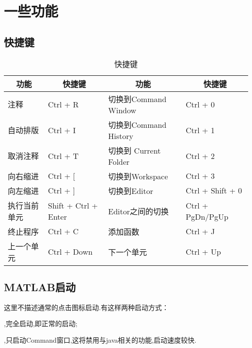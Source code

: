 \section{一些功能}

\subsection{快捷键}

\begin{center}
\begin{table}[htbp!]
  \centering
  \caption{快捷键}
    \begin{tabular}{ll|ll}
    \toprule
    \multicolumn{1}{c}{功能}    & \multicolumn{1}{c}{快捷键}   & \multicolumn{1}{c}{功能}    & \multicolumn{1}{c}{快捷键}\\
    \midrule
    注释          & Ctrl + R              & 切换到Command Window   & Ctrl + 0  \\
    自动排版      & Ctrl + I              & 切换到Command History  & Ctrl + 1 \\
    取消注释      & Ctrl + T              & 切换到 Current Folder  & Ctrl + 2  \\
    向右缩进      & Ctrl + [              & 切换到Workspace        & Ctrl + 3 \\
    向左缩进      & Ctrl + ]              & 切换到Editor           & Ctrl + Shift + 0 \\
    执行当前单元  & Shift + Ctrl + Enter  & Editor之间的切换       & Ctrl + PgDn/PgUp \\
    终止程序      & Ctrl + C              & 添加函数               & Ctrl + J \\
    上一个单元    & Ctrl + Down           & 下一个单元             & Ctrl + Up \\
    \bottomrule
    \end{tabular}%
\end{table}%
\end{center}





\subsection{MATLAB启动}

这里不描述通常的点击图标启动.有这样两种启动方式：

\begindot
  \item {},完全启动,即正常的启动;
  \item {},只启动Command窗口,这将禁用与java相关的功能,启动速度较快.
\myenddot

